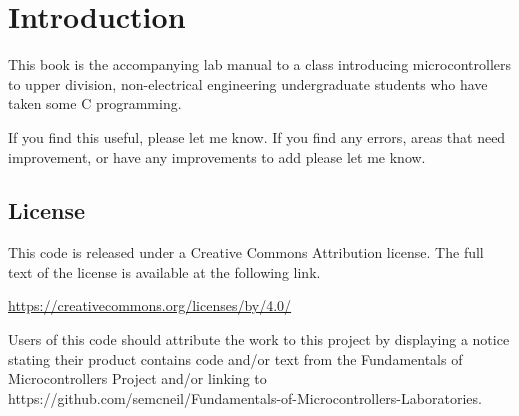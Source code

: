 \chapter{Introduction}

This book is the accompanying lab manual to a class introducing microcontrollers
to upper division, non-electrical engineering undergraduate students who 
have taken some C programming.

If you find this useful, please let me know. If you find any errors, areas
that need improvement, or have any improvements to add please let me know.

\section{License}
This code is released under a Creative Commons Attribution license.
The full text of the license is available at the following link.

\href{https://creativecommons.org/licenses/by/4.0/}{https://creativecommons.org/licenses/by/4.0/}

Users of this code should attribute the work to this
project by displaying a notice stating their product contains code
and/or text from the Fundamentals of Microcontrollers Project and/or linking to\\
https://github.com/semcneil/Fundamentals-of-Microcontrollers-Laboratories.